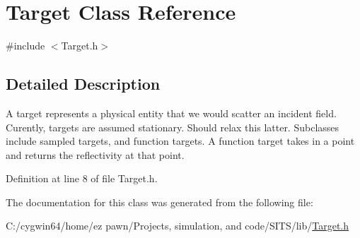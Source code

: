\hypertarget{class_target}{}\section{Target Class Reference}
\label{class_target}


{\ttfamily \#include $<$Target.\+h$>$}



\subsection{Detailed Description}
A target represents a physical entity that we would scatter an incident field. Curently, targets are assumed stationary. Should relax this latter. Subclasses include sampled targets, and function targets. A function target takes in a point and returns the reflectivity at that point. 

Definition at line 8 of file Target.\+h.



The documentation for this class was generated from the following file\+:\begin{DoxyCompactItemize}
\item 
C\+:/cygwin64/home/ez pawn/\+Projects, simulation, and code/\+S\+I\+T\+S/lib/\hyperlink{_target_8h}{Target.\+h}\end{DoxyCompactItemize}
